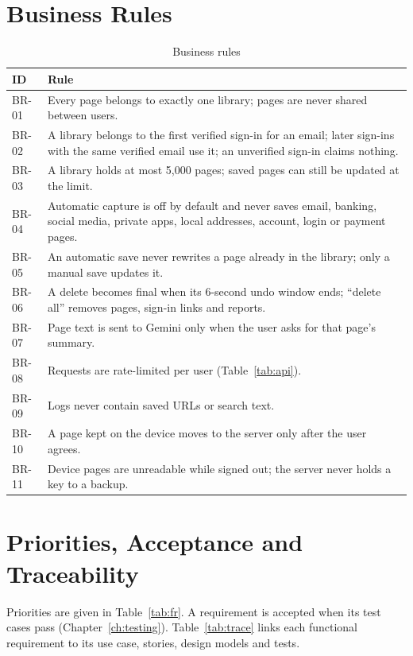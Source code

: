 \section{Business Rules}

\begin{table}[H]
\centering
\footnotesize
\begin{tabularx}{\textwidth}{>{\ttfamily}p{} L}
\toprule
\textrm{\textbf{ID}} & \textbf{Rule} \\
\midrule
BR-01 & Every page belongs to exactly one library; pages are never shared between users. \\
BR-02 & A library belongs to the first verified sign-in for an email; later sign-ins with the same verified email use it; an unverified sign-in claims nothing. \\
BR-03 & A library holds at most 5{,}000 pages; saved pages can still be updated at the limit. \\
BR-04 & Automatic capture is off by default and never saves email, banking, social media, private apps, local addresses, account, login or payment pages. \\
BR-05 & An automatic save never rewrites a page already in the library; only a manual save updates it. \\
BR-06 & A delete becomes final when its 6-second undo window ends; ``delete all'' removes pages, sign-in links and reports. \\
BR-07 & Page text is sent to Gemini only when the user asks for that page's summary. \\
BR-08 & Requests are rate-limited per user (Table~\ref{tab:api}). \\
BR-09 & Logs never contain saved URLs or search text. \\
BR-10 & A page kept on the device moves to the server only after the user agrees. \\
BR-11 & Device pages are unreadable while signed out; the server never holds a key to a backup. \\
\bottomrule
\end{tabularx}
\caption{Business rules}
\label{tab:rules}
\end{table}

\section{Priorities, Acceptance and Traceability}
\label{sec:trace}

Priorities are given in Table~\ref{tab:fr}. A requirement is accepted when
its test cases pass (Chapter~\ref{ch:testing}). Table~\ref{tab:trace} links
each functional requirement to its use case, stories, design models and
tests.

